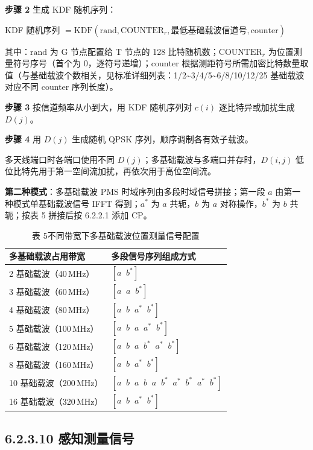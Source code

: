 \documentclass[11pt,a4paper]{ctexart}
\begin{document}
\textbf{步骤 2} 生成 KDF 随机序列：
\begin{center}
KDF 随机序列 $= \mathrm{KDF}(\mathrm{rand}, \mathrm{COUNTER}_r, \text{最低基础载波信道号}, \mathrm{counter})$
\end{center}

其中：$\mathrm{rand}$ 为 G 节点配置给 T 节点的 128 比特随机数；$\mathrm{COUNTER}_r$ 为位置测量符号序号（首个为 0，逐符号递增）；$\mathrm{counter}$ 根据测距符号所需加密比特数量取值（与基础载波个数相关，见标准详细列表：1/2\textasciitilde 3/4/5\textasciitilde 6/8/10/12/25 基础载波对应不同 counter 序列长度）。

\textbf{步骤 3} 按信道频率从小到大，用 KDF 随机序列对 $c(i)$ 逐比特异或加扰生成 $D(j)$。

\textbf{步骤 4} 用 $D(j)$ 生成随机 QPSK 序列，顺序调制各有效子载波。

多天线端口时各端口使用不同 $D(j)$；多基础载波与多端口并存时，$D(i,j)$ 低位比特先用于第一空间流加扰，再依次用于高位空间流。

\textbf{第二种模式}：多基础载波 PMS 时域序列由多段时域信号拼接；第一段 $a$ 由第一种模式单基础载波信号 IFFT 得到；$a^*$ 为 $a$ 共轭，$b$ 为 $a$ 对称操作，$b^*$ 为 $b$ 共轭；按表 5 拼接后按 6.2.2.1 添加 CP。

\begin{table}[h]
\centering
\caption{表 5\quad 不同带宽下多基础载波位置测量信号配置}
\small
\begin{tabular}{ll}
\toprule
\textbf{多基础载波占用带宽} & \textbf{多段信号序列组成方式} \\
\midrule
2 基础载波（40\,MHz） & $[a\;\; b^*]$ \\
3 基础载波（60\,MHz） & $[a\;\; a\;\; b^*]$ \\
4 基础载波（80\,MHz） & $[a\;\; b\;\; a^*\;\; b^*]$ \\
5 基础载波（100\,MHz） & $[a\;\; b\;\; a\;\; a^*\;\; b^*]$ \\
6 基础载波（120\,MHz） & $[a\;\; b\;\; a\;\; b^*\;\; a^*\;\; b^*]$ \\
8 基础载波（160\,MHz） & $[a\;\; b\;\; a^*\;\; b^*]$ \\
10 基础载波（200\,MHz） & $[a\;\; b\;\; a\;\; b\;\; a\;\; b^*\;\; a^*\;\; b^*\;\; a^*\;\; b^*]$ \\
16 基础载波（320\,MHz） & $[a\;\; b\;\; a^*\;\; b^*]$ \\
\bottomrule
\end{tabular}
\end{table}

\subsection{6.2.3.10 感知测量信号}
\end{document}
